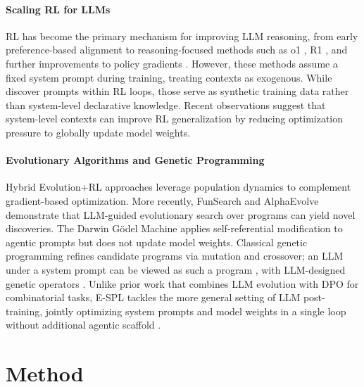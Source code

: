 \documentclass{article}
\theoremstyle{plain}
\theoremstyle{definition}
\theoremstyle{remark}
\begin{document}
\vspace{-5pt}
\paragraph{Scaling RL for LLMs} RL has become the primary mechanism for improving LLM reasoning, from early preference-based alignment \citep{learning-to-summarize, instructgpt} to reasoning-focused methods such as o1 \citep{o1-system-card}, R1 \citep{grpo, deepseek-r1}, and further improvements to policy gradients \citep{dapo, cispo, williams1992simple, ppo}. However, these methods assume a fixed system prompt during training, treating contexts as exogenous. While \citet{reward-guided-prompt-evolving} discover prompts within RL loops, those serve as synthetic training data rather than system-level declarative knowledge. Recent observations \citep{tan2025inoculation, azarbal2025recontextualization, macdiarmid2025natural} suggest that system-level contexts can improve RL generalization by reducing optimization pressure to globally update model weights.

\vspace{-5pt}
\paragraph{Evolutionary Algorithms and Genetic Programming} Hybrid Evolution+RL approaches \citep{erl, jaderberg2017population, cem-rl} leverage population dynamics to complement gradient-based optimization. More recently, FunSearch \citep{romera2024mathematical} and AlphaEvolve \citep{alphaevolve} demonstrate that LLM-guided evolutionary search over programs can yield novel discoveries. The Darwin Gödel Machine \citep{darwin-godel-machine} applies self-referential modification to agentic prompts but does not update model weights. Classical genetic programming \citep{koza1994genetic, langdon2013foundations} refines candidate programs via mutation and crossover; an LLM under a system prompt can be viewed as such a program \citep{gepa, alphaevolve}, with LLM-designed genetic operators \citep{hemberg2024evolving}. Unlike prior work that combines LLM evolution with DPO \citep{dpo} for combinatorial tasks, E-SPL tackles the more general setting of LLM post-training, jointly optimizing system prompts and model weights in a single loop without additional agentic scaffold \citep{ai-co-scientist}.



\section{Method}
\end{document}
